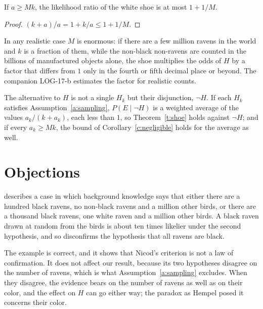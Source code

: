 \documentclass{situationist-preprint}
\begin{document}
\begin{corollary}\label{c:negligible}
If $a \geq Mk$, the likelihood ratio of the white shoe is at most $1 + 1/M$.
\end{corollary}

\begin{proof}
$(k+a)/a = 1 + k/a \leq 1 + 1/M$.
\end{proof}

In any realistic case $M$ is enormous: if there are a few million ravens in the world and $k$ is a fraction of them, while the non-black non-ravens are counted in the billions of manufactured objects alone, the shoe multiplies the odds of $H$ by a factor that differs from $1$ only in the fourth or fifth decimal place or beyond. The companion LOG-17-b estimates the factor for realistic counts.

\begin{remark}\label{r:mixture}
The alternative to $H$ is not a single $H_k$ but their disjunction, $\neg H$. If each $H_k$ satisfies Assumption~\ref{a:sampling}, $P(E \mid \neg H)$ is a weighted average of the values $a_k/(k+a_k)$, each less than $1$, so Theorem~\ref{t:shoe} holds against $\neg H$; and if every $a_k \geq M k$, the bound of Corollary~\ref{c:negligible} holds for the average as well.
\end{remark}

\section{Objections}

\begin{objection}\label{o:good}
\citet{Good1967} describes a case in which background knowledge says that either there are a hundred black ravens, no non-black ravens and a million other birds, or there are a thousand black ravens, one white raven and a million other birds. A black raven drawn at random from the birds is about ten times likelier under the second hypothesis, and so disconfirms the hypothesis that all ravens are black.
\end{objection}

\begin{reply}
The example is correct, and it shows that Nicod's criterion is not a law of confirmation. It does not affect our result, because its two hypotheses disagree on the number of ravens, which is what Assumption~\ref{a:sampling} excludes. When they disagree, the evidence bears on the number of ravens as well as on their color, and the effect on $H$ can go either way; the paradox as Hempel posed it concerns their color.
\end{reply}
\end{document}
